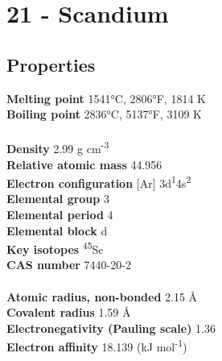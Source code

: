 \section{21 - Scandium}
\label{sec:elem-scandium}
\subsection{Properties}
\textbf{Melting point} 1541°C, 2806°F, 1814 K\\
\textbf{Boiling point} 2836°C, 5137°F, 3109 K\\
\\
\textbf{Density} 2.99 g cm\textsuperscript{-3}\\
\textbf{Relative atomic mass} 44.956\\
\textbf{Electron configuration} [Ar] 3d\textsuperscript{1}4s\textsuperscript{2}\\
\textbf{Elemental group} 3\\
\textbf{Elemental period} 4\\
\textbf{Elemental block} d\\
\textbf{Key isotopes} \textsuperscript{45}Sc\\
\textbf{CAS number} 7440-20-2\\
\\
\textbf{Atomic radius, non-bonded} 2.15 Å\\
\textbf{Covalent radius} 1.59 Å\\
\textbf{Electronegativity (Pauling scale)} 1.36\\
\textbf{Electron affinity} 18.139 (kJ mol\textsuperscript{-1})\\